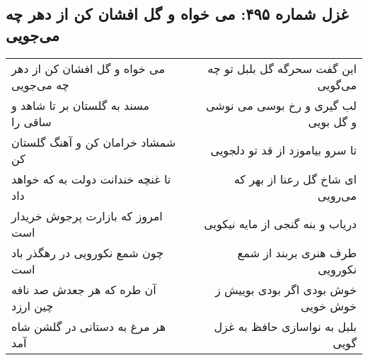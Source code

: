 \begin{center}
\section*{غزل شماره ۴۹۵: می خواه و گل افشان کن از دهر چه می‌جویی}
\label{sec:sh495}
\begin{longtable}{l p{0.5cm} r}
می خواه و گل افشان کن از دهر چه می‌جویی
&&
این گفت سحرگه گل بلبل تو چه می‌گویی
\\
مسند به گلستان بر تا شاهد و ساقی را
&&
لب گیری و رخ بوسی می نوشی و گل بویی
\\
شمشاد خرامان کن و آهنگ گلستان کن
&&
تا سرو بیاموزد از قد تو دلجویی
\\
تا غنچه خندانت دولت به که خواهد داد
&&
ای شاخ گل رعنا از بهر که می‌رویی
\\
امروز که بازارت پرجوش خریدار است
&&
دریاب و بنه گنجی از مایه نیکویی
\\
چون شمع نکورویی در رهگذر باد است
&&
طرف هنری بربند از شمع نکورویی
\\
آن طره که هر جعدش صد نافه چین ارزد
&&
خوش بودی اگر بودی بوییش ز خوش خویی
\\
هر مرغ به دستانی در گلشن شاه آمد
&&
بلبل به نواسازی حافظ به غزل گویی
\\
\end{longtable}
\end{center}
